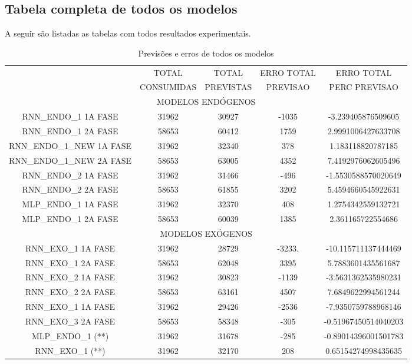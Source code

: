                 
        \subsection{Tabela completa de todos os modelos}
            A seguir são listadas as tabelas com todos resultados experimentais.
     
        \begin{table}[!ht]
        \caption{Previsões e erros de todos os modelos}
        \begin{adjustbox}{width=\columnwidth,center}
           \begin{tabular}{ | c | c| c | c| c | }
     \rowcolor{gray!50}
    \multirow{2}{*}{	MODELO} & TOTAL  & TOTAL  & ERRO TOTAL & ERRO TOTAL  \\ \rowcolor{gray!50}
   &                        CONSUMIDAS & PREVISTAS &  PREVISAO &  PERC PREVISAO  \\ 
    \multicolumn{5}{c}{	MODELOS ENDÓGENOS }  \\ \hline
	RNN\_ENDO\_1 1A FASE & 31962 & 30927 & -1035 & -3.239405876509605 \\ \hline
	RNN\_ENDO\_1 2A FASE & 58653 & 60412 & 1759 & 2.9991006427633708 \\ \hline
	RNN\_ENDO\_1\_NEW 1A FASE & 31962 & 32340 & 378 & 1.183118820787185 \\ \hline
	RNN\_ENDO\_1\_NEW 2A FASE & 58653 & 63005& 4352 & 7.4192976062605496 \\ \hline
	RNN\_ENDO\_2 1A FASE & 31962 & 31466 & -496 & -1.5530588570020649 \\ \hline
	RNN\_ENDO\_2 2A FASE & 58653 & 61855 & 3202 & 5.4594660545922631 \\ \hline
	MLP\_ENDO\_1 1A FASE & 31962 & 32370 & 408 & 1.2754342559132721 \\ \hline
	MLP\_ENDO\_1 2A FASE & 58653 & 60039 & 1385 & 2.361165722554686 \\ \hline
	\multicolumn{5}{c}{ MODELOS EXÓGENOS }\\ \hline
	RNN\_EXO\_1 1A FASE & 31962 & 28729 & -3233. & -10.115711137444469 \\ \hline
	RNN\_EXO\_1 2A FASE & 58653 & 62048 & 3395 & 5.7883601435561687 \\ \hline
	RNN\_EXO\_2 1A FASE & 31962 & 30823 & -1139& -3.5631362535980231 \\ \hline
	RNN\_EXO\_2 2A FASE & 58653 & 63161 & 4507 & 7.6849622994561244 \\ \hline
	RNN\_EXO\_1 1A FASE & 31962 & 29426 & -2536 & -7.9350759788968146 \\ \hline
	RNN\_EXO\_3 2A FASE & 58653 & 58348 & -305 & -0.51967450514040203 \\ \hline
	MLP\_ENDO\_1 (**) & 31962 & 31678 & -285 & -0.89014396001501783 \\ \hline
	RNN\_EXO\_1 (**) & 31962 & 32170 & 208 & 0.65154274998435635 \\ \hline
\end{tabular} \end{adjustbox} \end{table} 

